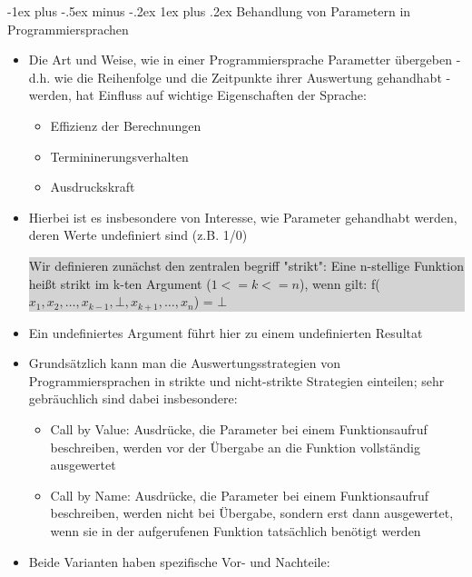 \documentclass[10pt]{article}
\makeatletter
\renewcommand{\subsubsection}{\@startsection{subsubsection}{3}{0mm}%
                                {-1ex plus -.5ex minus -.2ex}%
                                {1ex plus .2ex}%
                                {\normalfont\small\bfseries}}
\makeatother
\begin{document}
\subsubsection{Behandlung von Parametern in Programmiersprachen}
\begin{itemize}
  \item Die Art und Weise, wie in einer Programmiersprache Parametter übergeben - d.h. wie die Reihenfolge und die Zeitpunkte ihrer Auswertung gehandhabt - werden, hat Einfluss auf wichtige Eigenschaften der Sprache:
        \begin{itemize}
          \item Effizienz der Berechnungen
          \item Termininerungsverhalten
          \item Ausdruckskraft
        \end{itemize}
  \item Hierbei ist es insbesondere von Interesse, wie Parameter gehandhabt werden, deren Werte undefiniert sind (z.B. 1/0)\newline
        \colorbox{lightgray}{
          \begin{minipage}[h]{1.0\linewidth}
            Wir definieren zunächst den zentralen begriff "strikt": \newline Eine n-stellige Funktion heißt strikt im k-ten Argument ($1<=k<=n$), wenn gilt: f($x_1,x_2,…,x_{k-1},\bot,x_{k+1},…,x_n$) = $\bot$
          \end{minipage}}
  \item Ein undefiniertes Argument führt hier zu einem undefinierten Resultat
  \item Grundsätzlich kann man die Auswertungsstrategien von Programmiersprachen in strikte und nicht-strikte Strategien einteilen; sehr gebräuchlich sind dabei insbesondere:
        \begin{itemize}
          \item Call by Value: Ausdrücke, die Parameter bei einem Funktionsaufruf beschreiben, werden vor der Übergabe an die Funktion vollständig ausgewertet
          \item Call by Name: Ausdrücke, die Parameter bei einem Funktionsaufruf beschreiben, werden nicht bei Übergabe, sondern erst dann ausgewertet, wenn sie in der aufgerufenen Funktion tatsächlich benötigt werden
        \end{itemize}
  \item Beide Varianten haben spezifische Vor- und Nachteile:
        \begin{itemize}

\end{itemize}
\end{itemize}
\end{document}

